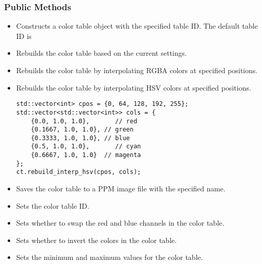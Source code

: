 \documentclass[a4paper,onecolumn,11pt]{doofus}
\begin{document}
\subsubsection*{Public Methods}

\begin{itemize}
\item {}
Constructs a color table object with the specified table ID. The default table ID is 

\item {}
Rebuilds the color table based on the current settings.

\item {}
Rebuilds the color table by interpolating RGBA colors at specified positions.


\item {}
Rebuilds the color table by interpolating HSV colors at specified positions.
%
\begin{lstlisting}[style=cppstyle]
std::vector<int> cpos = {0, 64, 128, 192, 255};
std::vector<std::vector<int>> cols = {
    {0.0, 1.0, 1.0},       // red
    {0.1667, 1.0, 1.0}, // green
    {0.3333, 1.0, 1.0}, // blue
    {0.5, 1.0, 1.0},       // cyan
    {0.6667, 1.0, 1.0}  // magenta
};
ct.rebuild_interp_hsv(cpos, cols);
\end{lstlisting}

\item {}
Saves the color table to a PPM image file with the specified name.

\item {}
Sets the color table ID.

\item {}
Sets whether to swap the red and blue channels in the color table.

\item {}
Sets whether to invert the colors in the color table.

\item{}
Sets the minimum and maximum values for the color table.


\end{itemize}
\end{document}
